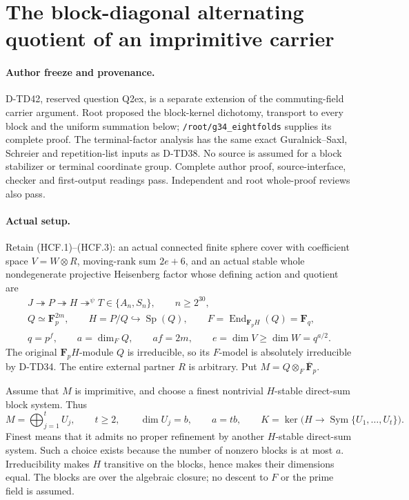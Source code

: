 \section{The block-diagonal alternating quotient of an imprimitive carrier}
\label{sec:heisenberg-imprimitive-diagonal-carrier}

\paragraph{Author freeze and provenance.}
D-TD42, reserved question Q2ex, is a separate extension of the
commuting-field carrier argument.  Root proposed the block-kernel
dichotomy, transport to every block and the uniform summation below;
\texttt{/root/g34\_eightfolds} supplies its complete proof.  The
terminal-factor analysis has the same exact Guralnick--Saxl,
Schreier and repetition-list inputs as D-TD38.  No source is
assumed for a block stabilizer or terminal coordinate group.
Complete author proof, source-interface, checker and first-output
readings pass.  Independent and root whole-proof reviews also pass.

\paragraph{Actual setup.}
Retain (HCF.1)--(HCF.3): an actual connected finite sphere cover
with coefficient space $V=W\otimes R$, moving-rank sum $2e+6$,
and an actual stable whole nondegenerate projective Heisenberg
factor whose defining action and quotient are
\[
 \begin{gathered}
 J\twoheadrightarrow P\twoheadrightarrow H
            \mathop{\twoheadrightarrow}^{\psi}T\in\{A_n,S_n\},
 \qquad n\ge2^{30},\\
 Q\simeq\mathbf F_p^{2m},\qquad H=P/Q\hookrightarrow\operatorname{Sp}(Q),
 \qquad F=\operatorname{End}_{\mathbf F_pH}(Q)=\mathbf F_q,\\
 q=p^f,\qquad a=\dim_F Q,\qquad af=2m,\qquad
 e=\dim V\ge\dim W=q^{a/2}.
 \end{gathered}
 \tag{HBD.1}
\]
The original $\mathbf F_pH$-module $Q$ is irreducible, so its
$F$-model is absolutely irreducible by D-TD34.  The entire external
partner $R$ is arbitrary.  Put $M=Q\otimes_F\overline{\mathbf F}_p$.

Assume that $M$ is imprimitive, and choose a finest nontrivial
$H$-stable direct-sum block system.  Thus
\[
 M=\bigoplus_{j=1}^{t}U_j,\qquad t\ge2,\qquad
 \dim U_j=b,\qquad a=tb,\qquad
 K=\ker\bigl(H\to\operatorname{Sym}\{U_1,\ldots,U_t\}\bigr).
 \tag{HBD.2}
\]
Finest means that it admits no proper refinement by another
$H$-stable direct-sum system.  Such a choice exists because the
number of nonzero blocks is at most $a$.  Irreducibility makes
$H$ transitive on the blocks, hence makes their dimensions equal.
The blocks are over the algebraic closure; no descent to $F$ or
the prime field is assumed.

